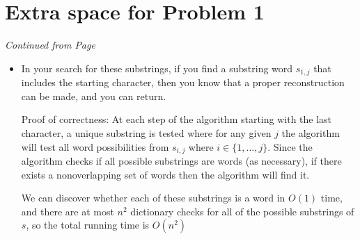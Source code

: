 \documentclass[11pt]{article}
\begin{document}
 \section*{Extra space for Problem 1}
 \emph{Continued from Page \pageref{pg:end-of-p1}}
 


 \label{pg:p1-continuation}
\begin{itemize}

\item[] 

% 
% 


In your search for these substrings, if you find a substring word $s_{1,j}$ that includes the starting
character, then you know that a proper reconstruction can be made, and you can return.

Proof of correctness: At each step of the algorithm starting with the last character, a unique substring is tested where for any given
$j$ the algorithm will test all word possibilities from $s_{i,j}$ where $i\in\{1,\ldots,j\}$. Since the algorithm checks if all possible
substrings are words (as necessary), if there exists a nonoverlapping set of words then the algorithm will find it.

We can discover whether each of these substrings is a word in $O(1)$ time, and there are at most $n^2$ dictionary checks for all of the possible
substrings of $s$, so the total running time is $O(n^2)$


\end{itemize}
\end{document}
